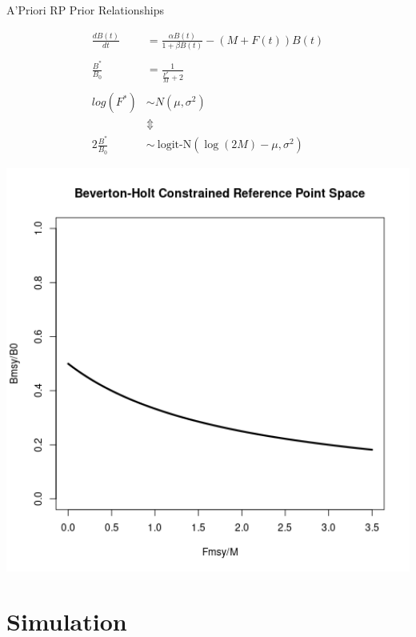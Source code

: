 \documentclass[ xcolor = pdftex, dvipsnames, table ]{beamer}
\begin{document}
%
\begin{frame}{A'Priori RP Prior Relationships}
\hspace*{-1cm}
\begin{minipage}[h!]{0.59\textwidth}
\begin{align*}
\frac{dB(t)}{dt} &= \frac{\alpha B(t)}{1+\beta B(t)} - (M+F(t))B(t)\\
~&~\\
\frac{B^*}{B_0} &= \frac{1}{\frac{F^*}{M}+2}\\
&~\\
log(F^*) &\sim N(\mu, \sigma^2)\\
&\Updownarrow\\
2\frac{B^*}{B_0} ~&\sim~ \text{logit-N}\left(\log(2M)-\mu, \sigma^2\right)
\end{align*}
\end{minipage}
\begin{minipage}[h!]{0.4\textwidth}
\includegraphics[width=1.25\textwidth]{bhConst.png}
\end{minipage}
\end{frame}

%
\section{Simulation}
\subsection{}
\end{document}
